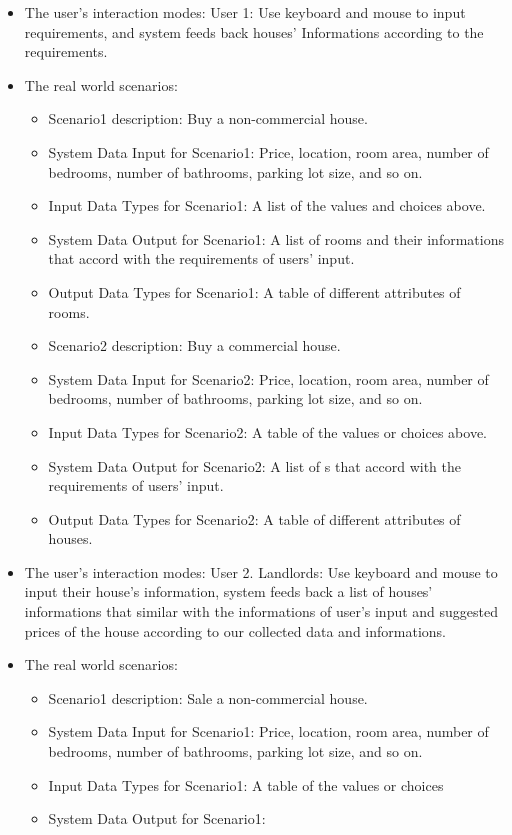 \begin{itemize}
\item{The user's interaction modes: }
User 1: Use keyboard and mouse to input requirements, and system feeds back houses'
Informations according to the requirements.
\item{The real world scenarios: }

	\begin{itemize} 
	\item{Scenario1 description: }
	Buy a non-commercial house.
	\item{System Data Input for Scenario1: }
     Price, location, room area, number of bedrooms, number of bathrooms, parking lot size, and so on.
	\item{Input Data Types for Scenario1: }
	A list of the values and choices above.
	\item{System Data Output for Scenario1: }
     A list of rooms and their informations that accord with the requirements of users' input. 
	\item{Output Data Types for Scenario1: }
	A table of different attributes of rooms.
	\end{itemize}
	\begin{itemize} 
	\item{Scenario2 description: }
	Buy a commercial house.
	\item{System Data Input for Scenario2: }
	Price, location, room area, number of bedrooms, number of bathrooms, parking lot size, and so on.
	\item{Input Data Types for Scenario2: }
	A table of the values or choices above.
	\item{System Data Output for Scenario2: }
	A list of s that accord with the requirements of users' input.
	\item{Output Data Types for Scenario2: }
	A table of different attributes of houses.
	\end{itemize}
	\item{The user's interaction modes: }
User 2. Landlords: Use keyboard and mouse to input their house's information, system feeds back a list of houses' informations that similar with the informations of user's input and suggested prices of the house according to our collected data and informations.
\item{The real world scenarios: }
	\begin{itemize}
	\item{Scenario1 description: }
	Sale a non-commercial house.
	\item{System Data Input for Scenario1: }
	Price, location, room area, number of bedrooms, number of bathrooms, parking lot size, and so on.
	\item{Input Data Types for Scenario1: }
	A table of the values or choices  
	\item{System Data Output for Scenario1: }


\end{itemize}
\end{itemize}
